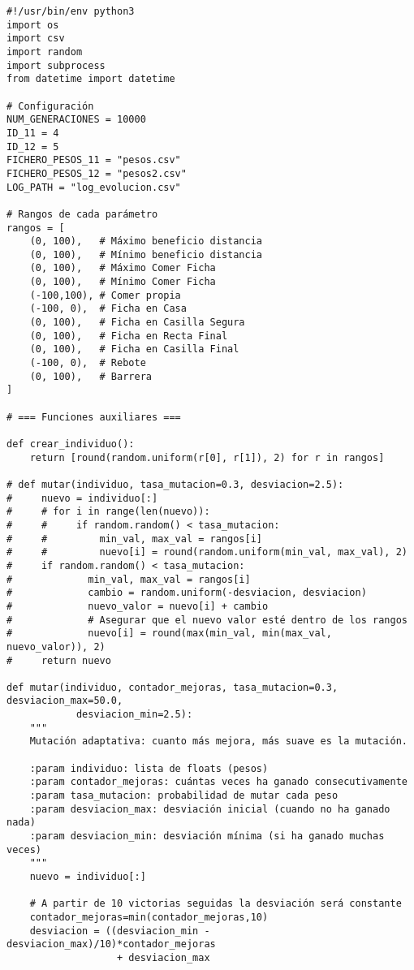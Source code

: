 \documentclass[12pt]{article}
\begin{document}
    \begin{verbatim}
#!/usr/bin/env python3
import os
import csv
import random
import subprocess
from datetime import datetime

# Configuración
NUM_GENERACIONES = 10000
ID_11 = 4
ID_12 = 5
FICHERO_PESOS_11 = "pesos.csv"
FICHERO_PESOS_12 = "pesos2.csv"
LOG_PATH = "log_evolucion.csv"

# Rangos de cada parámetro
rangos = [
    (0, 100),   # Máximo beneficio distancia
    (0, 100),   # Mínimo beneficio distancia
    (0, 100),   # Máximo Comer Ficha
    (0, 100),   # Mínimo Comer Ficha
    (-100,100), # Comer propia
    (-100, 0),  # Ficha en Casa
    (0, 100),   # Ficha en Casilla Segura
    (0, 100),   # Ficha en Recta Final
    (0, 100),   # Ficha en Casilla Final
    (-100, 0),  # Rebote
    (0, 100),   # Barrera
]

# === Funciones auxiliares ===

def crear_individuo():
    return [round(random.uniform(r[0], r[1]), 2) for r in rangos]

# def mutar(individuo, tasa_mutacion=0.3, desviacion=2.5):
#     nuevo = individuo[:]
#     # for i in range(len(nuevo)):
#     #     if random.random() < tasa_mutacion:
#     #         min_val, max_val = rangos[i]
#     #         nuevo[i] = round(random.uniform(min_val, max_val), 2)
#     if random.random() < tasa_mutacion:
#             min_val, max_val = rangos[i]
#             cambio = random.uniform(-desviacion, desviacion)
#             nuevo_valor = nuevo[i] + cambio
#             # Asegurar que el nuevo valor esté dentro de los rangos
#             nuevo[i] = round(max(min_val, min(max_val, nuevo_valor)), 2)
#     return nuevo

def mutar(individuo, contador_mejoras, tasa_mutacion=0.3, desviacion_max=50.0, 
            desviacion_min=2.5):
    """
    Mutación adaptativa: cuanto más mejora, más suave es la mutación.

    :param individuo: lista de floats (pesos)
    :param contador_mejoras: cuántas veces ha ganado consecutivamente
    :param tasa_mutacion: probabilidad de mutar cada peso
    :param desviacion_max: desviación inicial (cuando no ha ganado nada)
    :param desviacion_min: desviación mínima (si ha ganado muchas veces)
    """
    nuevo = individuo[:]

    # A partir de 10 victorias seguidas la desviación será constante
    contador_mejoras=min(contador_mejoras,10)
    desviacion = ((desviacion_min - desviacion_max)/10)*contador_mejoras 
                   + desviacion_max


\end{verbatim}
\end{document}
